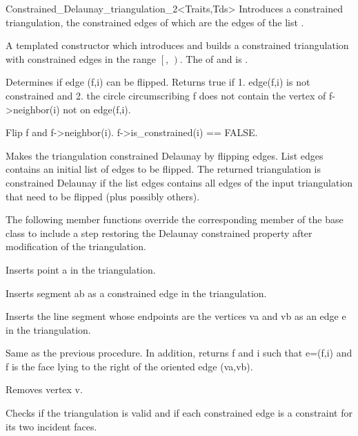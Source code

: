 \begin{ccClassTemplate}{Constrained_Delaunay_triangulation_2<Traits,Tds>}
{Introduces a constrained triangulation, the constrained edges of which
are the edges of the list .}


{A templated constructor which introduces and builds
 a constrained triangulation with constrained edges in the range 
$\left[\right.$, $\left.\right)$.
\ccPrecond The  of  and 
 is .}

\begin{ccAdvanced}

{ Determines if edge (f,i) can be flipped. Returns true if
1. edge(f,i) is not constrained and 2. the circle circumscribing f
does not contain the vertex of f->neighbor(i) not on edge(f,i). }

{ Flip f and f->neighbor(i).
\ccPrecond f->is\_constrained(i) == FALSE.}


{ Makes the triangulation constrained Delaunay by flipping edges. 
List edges contains an
initial list of edges to be flipped. The returned
triangulation is constrained Delaunay 
if the list edges contains all edges of the
input triangulation that need to be flipped (plus possibly others). }
\end{ccAdvanced}

The following member functions override the corresponding
member of the base class to include a step restoring
 the Delaunay constrained
property after modification of the triangulation.

{ Inserts point a in the triangulation. }

{ Inserts segment ab as a constrained edge in the triangulation. }

{ Inserts the line segment whose endpoints are the vertices va and vb
as an edge e in the triangulation. }

{Same as the previous procedure. In addition, returns f and i such that
e=(f,i) and f is the face lying to the right of the oriented edge (va,vb). }


{ Removes vertex v. }



{ Checks if the triangulation is valid and if each constrained edge is
a constraint for its two incident faces.}

\end{ccClassTemplate}
